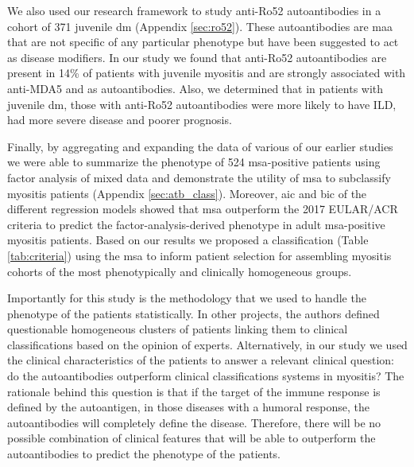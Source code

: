 We also used our research framework to study anti-Ro52 autoantibodies in a cohort of 371 juvenile \gls{dm} (Appendix \autoref{sec:ro52}). These autoantibodies are \gls{maa} that are not specific of any particular phenotype but have been suggested to act as disease modifiers. In our study we found that anti-Ro52 autoantibodies are present in 14\% of patients with juvenile myositis and are strongly associated with anti-MDA5 and \gls{as} autoantibodies. Also, we determined that in patients with juvenile \gls{dm}, those with anti-Ro52 autoantibodies were more likely to have ILD, had more severe disease and poorer prognosis.

Finally, by aggregating and expanding the data of various of our earlier studies we were able to summarize the phenotype of 524 \gls{msa}-positive patients using factor analysis of mixed data and demonstrate the utility of \gls{msa} to subclassify myositis patients (Appendix \autoref{sec:atb_class}). Moreover, \gls{aic} and \gls{bic} of the different regression models showed that \gls{msa} outperform the 2017 EULAR/ACR criteria to predict the factor-analysis-derived phenotype in adult \gls{msa}-positive myositis patients. Based on our results we proposed a classification (Table \ref{tab:criteria}) using the \gls{msa} to inform patient selection for assembling myositis cohorts of the most phenotypically and clinically homogeneous groups.

Importantly for this study is the methodology that we used to handle the phenotype of the patients statistically. In other projects, the authors defined questionable homogeneous clusters of patients linking them to clinical classifications based on the opinion of experts.\cite{Mariampillai2018} Alternatively, in our study we used the clinical characteristics of the patients to answer a relevant clinical question: do the autoantibodies outperform clinical classifications systems in myositis? The rationale behind this question is that if the target of the immune response is defined by the autoantigen, in those diseases with a humoral response, the autoantibodies will completely define the disease. Therefore, there will be no possible combination of clinical features that will be able to outperform the autoantibodies to predict the phenotype of the patients.


